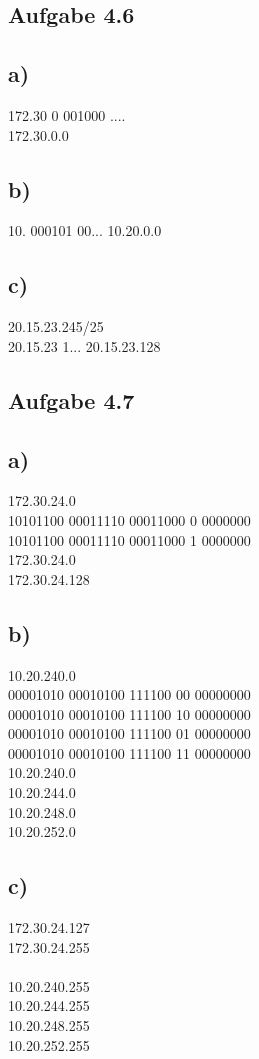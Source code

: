 \documentclass{article}
\begin{document}
	\subsection*{Aufgabe 4.6}
	\subsection*{a)}
	172.30 0 001000 .... \\
	172.30.0.0
	\subsection*{b)}
	10. 000101 00... 10.20.0.0
	\subsection*{c)}
	20.15.23.245/25 \\
	20.15.23 1... 20.15.23.128
	\subsection*{Aufgabe 4.7}
	\subsection*{a)}
	172.30.24.0 \\
	10101100 00011110 00011000 0 0000000 \\
	10101100 00011110 00011000 1 0000000 \\
	172.30.24.0 \\
	172.30.24.128 \\
	\subsection*{b)}
	10.20.240.0 \\
	00001010 00010100 111100 00 00000000 \\
	00001010 00010100 111100 10 00000000 \\
	00001010 00010100 111100 01 00000000 \\
	00001010 00010100 111100 11 00000000 \\
	10.20.240.0 \\
	10.20.244.0 \\
	10.20.248.0 \\
	10.20.252.0 \\
	
	\subsection*{c)}
	172.30.24.127 \\
	172.30.24.255
	\\ \\
	10.20.240.255 \\
	10.20.244.255 \\
	10.20.248.255 \\
	10.20.252.255 \\
\end{document}

